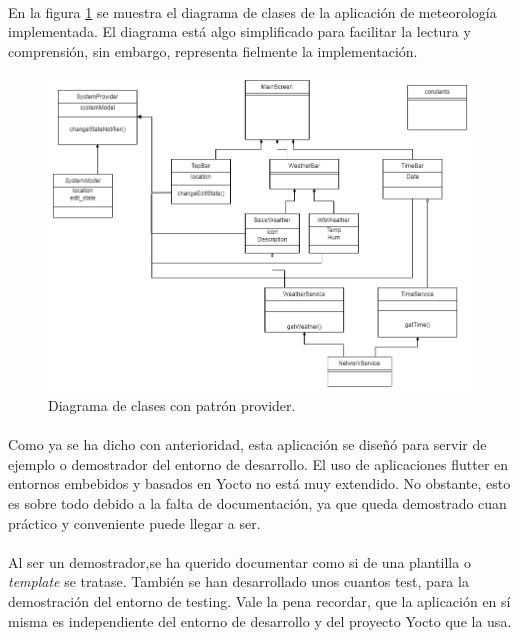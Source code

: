 \paragraph{}En la figura \ref{fig:classDiagram} se muestra el diagrama de clases de la
aplicación de meteorología implementada. El diagrama está algo simplificado para facilitar
la lectura y comprensión, sin embargo, representa fielmente la implementación.

\begin{figure}[H]
	\centering
	\includegraphics[width=0.95\linewidth]{figs/rpi_weather-class_diagram}
	\caption[Patron Provider]{Diagrama de clases con patrón provider.}
	\label{fig:classDiagram}
\end{figure}

\paragraph{}Como ya se ha dicho con anterioridad, esta aplicación se diseñó para servir
de ejemplo o demostrador del entorno de desarrollo. El uso de aplicaciones flutter en
entornos embebidos y basados en Yocto no está muy extendido. No obstante, esto es sobre
todo debido a la falta de documentación, ya que queda demostrado cuan práctico y
conveniente puede llegar a ser.

\paragraph{}Al ser un demostrador,se ha querido documentar como si de una plantilla o
\emph{template} se tratase. También se han desarrollado unos cuantos test, para la
demostración del entorno de testing. Vale la pena recordar, que la aplicación en sí
misma es independiente del entorno de desarrollo y del proyecto Yocto que la usa.

